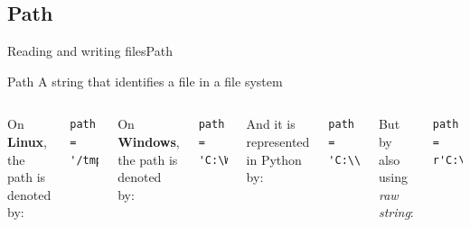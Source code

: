\documentclass[10pt,compress]{beamer} %
\begin{document}
\subsection{Path}

\begin{frame}[fragile]{Reading and writing files}{Path}
    \begin{block}{Path}
	A string that identifies a file in a file system
    \end{block}

	\begin{columns}
		On \textbf{Linux}, the path is denoted by: \\
\begin{verbatim}
path = '/tmp/prueba.txt'
\end{verbatim}
		On \textbf{Windows}, the path is denoted by: \\
\begin{verbatim}
path = 'C:\Windows\Temp'
\end{verbatim}
		And it is represented  in Python by:\\
\begin{verbatim}
path = 'C:\\Windows\\Temp'
\end{verbatim}
		But by also using \textit{raw string}:
\begin{verbatim}
path = r'C:\Windows\Temp'
\end{verbatim}
	\end{columns}
\end{frame}
\end{document}
